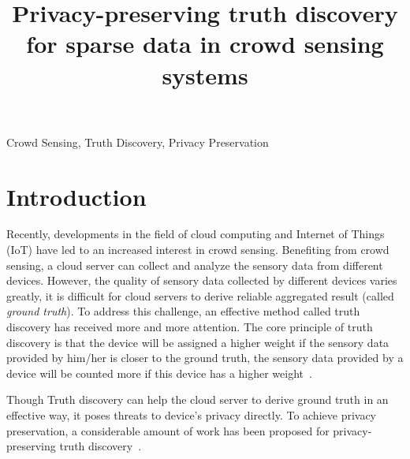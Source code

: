 \documentclass[conference]{IEEEtran}
\begin{document}
\title{Privacy-preserving truth discovery for sparse data in crowd sensing systems\\
}

\author{
}
\maketitle

\begin{abstract}

\end{abstract}

\begin{IEEEkeywords}
Crowd Sensing, Truth Discovery, Privacy Preservation
\end{IEEEkeywords}

\section{Introduction}\label{sec1}
Recently, developments in the field of cloud computing and Internet of Things (IoT) have led to an increased interest in crowd sensing.
Benefiting from crowd sensing, a cloud server can collect and analyze the sensory data from different devices.
However, the quality of sensory data collected by different devices varies greatly, it is difficult for cloud servers to derive reliable aggregated result (called \textit{ground truth}).
To address this challenge, an effective method called truth discovery has received more and more attention.
The core principle of truth discovery is that the device will be assigned a higher weight if the sensory data provided by him/her is closer to the ground truth, the sensory data provided by a device will be counted more if this device has a higher weight~\cite{miao_cloud-enabled_2015,xu_efficient_2019}.

Though Truth discovery can help the cloud server to derive ground truth in an effective way, it poses threats to device's privacy directly.
To achieve privacy preservation, a considerable amount of work has been proposed for privacy-preserving truth discovery~\cite{miao_cloud-enabled_2015,xu_efficient_2019,zhang_reliable_2019,xue_inpptd_2020}.
\end{document}

